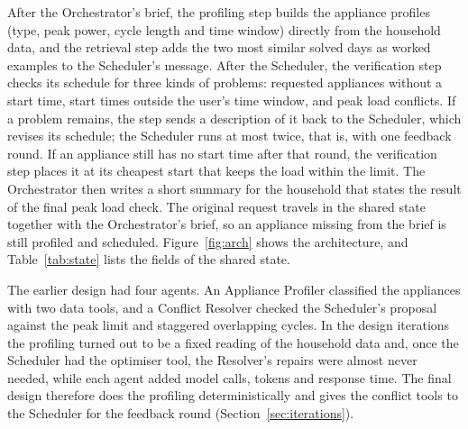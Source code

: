 \documentclass[12pt,a4paper]{report}
\begin{document}
After the Orchestrator's brief, the profiling step builds the appliance
profiles (type, peak power, cycle length and time window) directly from
the household data, and the retrieval step adds the two most similar
solved days as worked examples to the Scheduler's message. After the
Scheduler, the verification step checks its schedule for three kinds of
problems: requested appliances without a start time, start times
outside the user's time window, and peak load conflicts. If a problem
remains, the step sends a description of it back to the Scheduler,
which revises its schedule; the Scheduler runs at most twice, that is,
with one feedback round. If an appliance still has no start time after
that round, the verification step places it at its cheapest start that
keeps the load within the limit. The Orchestrator then writes a short
summary for the household that states the result of the final peak
load check. The original request travels in the shared state together
with the Orchestrator's brief, so an appliance missing from the brief
is still profiled and scheduled. Figure~\ref{fig:arch} shows the
architecture, and Table~\ref{tab:state} lists the fields of the shared
state.

The earlier design had four agents. An Appliance Profiler classified the
appliances with two data tools, and a Conflict Resolver checked the
Scheduler's proposal against the peak limit and staggered overlapping
cycles. In the design iterations the profiling turned out to be a fixed
reading of the household data and, once the Scheduler had the optimiser
tool, the Resolver's repairs were almost never needed, while each agent
added model calls, tokens and response time. The final design therefore
does the profiling deterministically and gives the conflict tools to the
Scheduler for the feedback round (Section~\ref{sec:iterations}).
\end{document}
